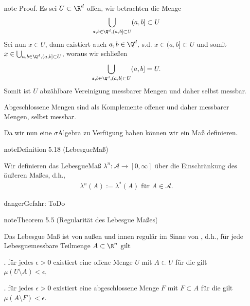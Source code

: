 \documentclass[letterpaper,10pt,german]{jupyterBook}
\begin{document}
\begin{sphinxadmonition}{note}
\sphinxAtStartPar
Proof. Es sei \(U\subset\R^d\) offen, wir betrachten die Menge
\begin{equation*}
\begin{split}\bigcup_{a,b\in \Q^d, (a,b]\subset U} (a,b]\subset U\end{split}
\end{equation*}
\sphinxAtStartPar
Sei nun \(x\in U\), dann existiert auch \(a,b\in\Q^d\), s.d. \(x\in(a,b]\subset U\) und somit \(x\in\bigcup_{a,b\in \Q^d, (a,b]\subset U}\), woraus wir schließen
\begin{equation*}
\begin{split}\bigcup_{a,b\in \Q^d, (a,b]\subset U} (a,b] = U.\end{split}
\end{equation*}
\sphinxAtStartPar
Somit ist \(U\) abzählbare Vereinigung messbarer Mengen und daher selbst messbar.

\sphinxAtStartPar
Abgeschlossene Mengen sind als Komplemente offener und daher messbarer Mengen, selbst messbar.
\end{sphinxadmonition}

\sphinxAtStartPar
Da wir nun eine \(\sigma\)\sphinxhyphen{}Algebra zu Verfügung haben können wir ein Maß definieren.
\label{masstheorie/masstheorie:definition-46}
\begin{sphinxadmonition}{note}{Definition 5.18 (Lebesgue\sphinxhyphen{}Maß)}



\sphinxAtStartPar
Wir definieren das Lebesgue\sphinxhyphen{}Maß \(\lambda^n:\mathcal{A}\to[0,\infty]\) über die Einschränkung des äußeren Maßes, d.h.,
\begin{equation*}
\begin{split}\lambda^n(A):= \lambda^\ast(A)\text{ für } A\in\mathcal{A}.\end{split}
\end{equation*}\end{sphinxadmonition}

\begin{sphinxadmonition}{danger}{Gefahr:}
\sphinxAtStartPar
ToDo
\end{sphinxadmonition}
\label{masstheorie/masstheorie:theorem-47}
\begin{sphinxadmonition}{note}{Theorem 5.5 (Regularität des Lebesgue Maßes)}



\sphinxAtStartPar
Das Lebesgue Maß ist von außen und innen regulär im Sinne von {\hyperref[\detokenize{masstheorie/masstheorie:def:regularitaet}]{}}, d.h., für jede Lebesgue\sphinxhyphen{}messbare Teilmenge \(A \subset \R^n\) gilt

. für jedes \(\epsilon > 0\) existiert eine offene Menge \(U\) mit \(A \subset U\) für die gilt \(\mu(U \setminus A) < \epsilon\),

. für jedes \(\epsilon > 0\) existiert eine abgeschlossene Menge \(F\) mit \(F \subset A\) für die gilt \(\mu(A \setminus F) < \epsilon\).
\end{sphinxadmonition}
\end{document}
